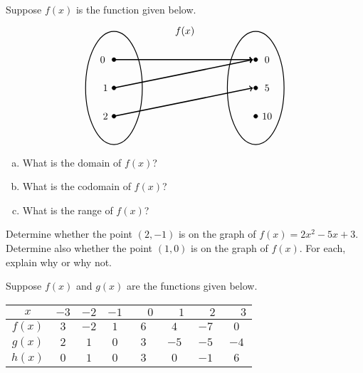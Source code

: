 \documentclass[11pt,letterpaper]{article}
\begin{document}
 Suppose $f(x)$ is the function given below.
	\[
	\begin{tikzpicture}
	\node at (2.5,2) {$f(x)$};
	\draw[line width=0.03cm] (0,0) circle (1 and 2);
	\draw[line width=0.03cm] (5,0) circle (1 and 2);
	
	\draw[fill=black] (0,1) circle (0.07);
	\draw[fill=black] (0,0) circle (0.07);
	\draw[fill=black] (0,-1) circle (0.07);
	
	\draw[fill=black] (5,1) circle (0.07);
	\draw[fill=black] (5,0) circle (0.07);
	\draw[fill=black] (5,-1) circle (0.07);
	
	\draw[line width=0.04cm,->] (0,1) -- (4.9,1);
	\draw[line width=0.04cm,->] (0,0) -- (4.9,1);
	\draw[line width=0.04cm,->] (0,-1) -- (4.9,0);
	
	\node at (-0.4,1) {$0$};
	\node at (-0.3,0) {$1$};
	\node at (-0.3,-1) {$2$};
	
	\node at (5.4,1) {$0$};
	\node at (5.4,0) {$5$};
	\node at (5.4,-1) {$10$};
	\end{tikzpicture}
	\]

\begin{enumerate}[(a)]
\item What is the domain of $f(x)$?
\item What is the codomain of $f(x)$?
\item What is the range of $f(x)$?
\end{enumerate} \pspace



\newpage



 Determine whether the point $(2, -1)$ is on the graph of $f(x)= 2x^2 - 5x + 3$. Determine also whether the point $(1, 0)$ is on the graph of $f(x)$. For each, explain why or why not. \pspace



\newpage



 Suppose $f(x)$ and $g(x)$ are the functions given below. 
        \begin{table}[!ht]
        \centering
        \begin{tabular}{| c || c | c | c | c | c | c | c |} \hline
	$x$ & $-3$ & $-2$ & $-1$ & $\phantom{-}0$ & $\phantom{-}1$ & $\phantom{-}2$ & $\phantom{-}3$ \\ \hline
	$f(x)$ & $3$ & $-2$ & $1$ & $6$ & $4$ & $-7$ & $0$ \\ \hline
	$g(x)$ & $2$ & $1$ & $0$ & $3$ & $-5$ & $-5$ & $-4$ \\ \hline
	$h(x)$ & $0$ & $1$ & $0$ & $3$ & $0$ & $-1$ & $6$ \\ \hline
        \end{tabular}
        \end{table}
\end{document}
